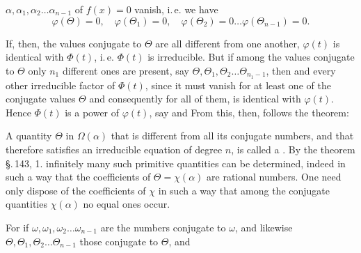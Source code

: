 $\alpha, \alpha_1, \alpha_2 \ldots \alpha_{n-1}$ of $f(x) = 0$ vanish, i.\,e. we have
\[
\varphi(\Theta) = 0,\quad \varphi(\Theta_1) = 0,\quad \varphi(\Theta_2) = 0 \ldots \varphi(\Theta_{n-1}) = 0.
\]

If, then, the values conjugate to $\Theta$ are all different from
one another, $\varphi(t)$ is identical with $\Phi(t)$, i.\,e.
$\Phi(t)$ is irreducible. But if among the values conjugate to
$\Theta$ only $n_1$ different ones are present,
say $\Theta, \Theta_1, \Theta_2 \ldots \Theta_{n_1-1}$, then
and every other irreducible factor of $\Phi(t)$, since it must
vanish for at least one of the conjugate values $\Theta$ and
consequently for all of them, is identical with $\varphi(t)$. Hence
$\Phi(t)$ is a power of $\varphi(t)$, say
and
From this, then, follows the theorem:


A quantity $\Theta$ in $\Omega(\alpha)$ that is different from all its
conjugate numbers, and that therefore satisfies an
irreducible equation of degree $n$, is called a
. By the theorem \S.\,143, 1. infinitely
many such primitive quantities can be determined, indeed in such a way that
the coefficients of $\Theta = \chi(\alpha)$ are rational numbers.
One need only dispose of the coefficients of $\chi$ in such a way
that among the conjugate quantities $\chi(\alpha)$ no equal ones
occur.


For if $\omega, \omega_1, \omega_2 \ldots \omega_{n-1}$ are the numbers
conjugate to $\omega$, and likewise $\Theta, \Theta_1, \Theta_2
\ldots \Theta_{n-1}$ those conjugate to $\Theta$, and
